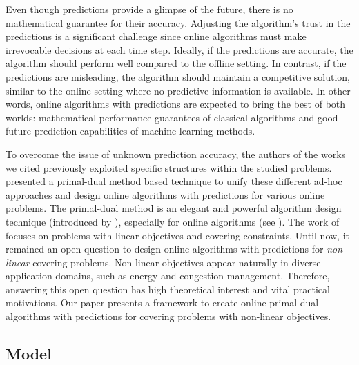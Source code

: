 Even though predictions provide a glimpse of the future, there is no mathematical guarantee for their accuracy. Adjusting the algorithm's trust in the predictions is a significant challenge since online algorithms must make irrevocable decisions at each time step. Ideally, if the predictions are accurate, the algorithm should perform well compared to the offline setting. In contrast, if the predictions are misleading, the algorithm should maintain a competitive solution, similar to the online setting where no predictive information is available. In other words, online algorithms with predictions are expected to bring the best of both worlds: mathematical performance guarantees of classical algorithms and good future prediction capabilities of machine learning methods.

To overcome the issue of unknown prediction accuracy, the authors of the works we cited previously exploited specific structures within the studied problems. \cite{BamasMaggiori20:The-Primal-Dual-method} presented a primal-dual method based technique to unify these different ad-hoc approaches and design online algorithms with predictions for various online problems. The primal-dual method is an elegant and powerful algorithm design technique (introduced by \cite{WilliamsonShmoys11:The-design-of-approximation}), especially for online algorithms (see \cite{BuchbinderNaor09:Online-primal-dual}). The work of \cite{BamasMaggiori20:The-Primal-Dual-method} focuses on problems with linear objectives and covering constraints. Until now, it remained an open question to design online algorithms with predictions for \emph{non-linear} covering problems. Non-linear objectives appear naturally in diverse application domains, such as energy and congestion management. Therefore, answering this open question has high theoretical interest and vital practical motivations. Our paper presents a framework to create online primal-dual algorithms with predictions for covering problems with non-linear objectives.


\subsection{Model}  	\label{sec:model}


